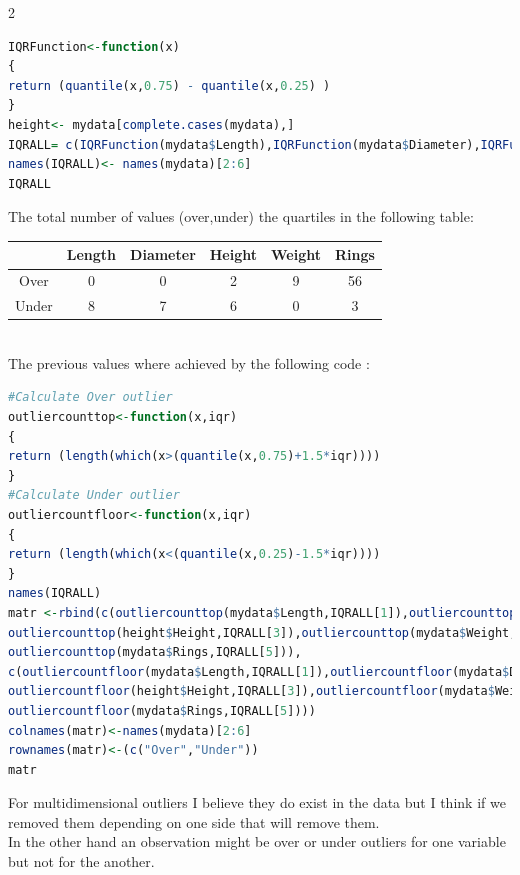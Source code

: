 \documentclass{article}
\begin{document}
\begin{multicols*}{2}
\begin{lstlisting}[language=R]
IQRFunction<-function(x)
{
return (quantile(x,0.75) - quantile(x,0.25) )
}
height<- mydata[complete.cases(mydata),]
IQRALL= c(IQRFunction(mydata$Length),IQRFunction(mydata$Diameter),IQRFunction(height$Height),IQRFunction(mydata$Weight),IQRFunction(mydata$Rings))
names(IQRALL)<- names(mydata)[2:6]
IQRALL
\end{lstlisting}
The total number of values (over,under) the quartiles in the following table:\\
\begin{tabular}{|c|c|c|c|c|c|}
	\hline
	&Length&Diameter&Height&Weight&Rings\\
	\hline
	Over&0&0&2&9&56\\
	\hline
	Under&8&7&6&0&3\\
	\hline
\end{tabular}
\\The previous values where achieved by the following code : 
\begin{lstlisting}[language=R]
#Calculate Over outlier
outliercounttop<-function(x,iqr)
{
return (length(which(x>(quantile(x,0.75)+1.5*iqr))))
}
#Calculate Under outlier
outliercountfloor<-function(x,iqr)
{
return (length(which(x<(quantile(x,0.25)-1.5*iqr))))
}
names(IQRALL)
matr <-rbind(c(outliercounttop(mydata$Length,IQRALL[1]),outliercounttop(mydata$Diameter,IQRALL[2]),
outliercounttop(height$Height,IQRALL[3]),outliercounttop(mydata$Weight,IQRALL[4]),
outliercounttop(mydata$Rings,IQRALL[5])),
c(outliercountfloor(mydata$Length,IQRALL[1]),outliercountfloor(mydata$Diameter,IQRALL[2]),
outliercountfloor(height$Height,IQRALL[3]),outliercountfloor(mydata$Weight,IQRALL[4]),
outliercountfloor(mydata$Rings,IQRALL[5])))
colnames(matr)<-names(mydata)[2:6]
rownames(matr)<-(c("Over","Under"))
matr
\end{lstlisting}
For multidimensional outliers I believe they do exist in the data but I think if we removed them depending on one side that will remove them.\\
In the other hand an observation might be over or under outliers for one variable but not for the another.


\end{multicols*}
\end{document}
